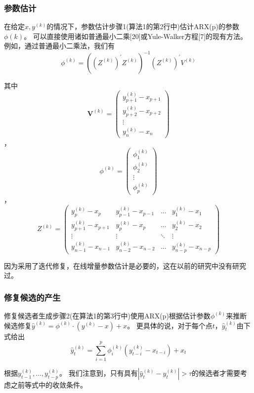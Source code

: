 \documentclass[12pt,a4paper]{article}
\begin{document}
\subsubsection{参数估计}
\par
在给定$x, y^{(k)}$的情况下，参数估计步骤1(算法1的第2行中)估计ARX(p)的参数$\phi(k)$。
可以直接使用诸如普通最小二乘[20]或Yule-Walker方程[7]的现有方法。例如，通过普通最小二乘法，我们有
\begin{equation}
\phi^{(k)}=\left(\left(Z^{(k)}\right)^{\prime} Z^{(k)}\right)^{-1}\left(Z^{(k)}\right)^{\prime} V^{(k)}
\end{equation}
\par
其中
\begin{equation}
\boldsymbol{V}^{(k)}=\left( \begin{array}{c}{y_{p+1}^{(k)}-x_{p+1}} \\ {y_{p+2}^{(k)}-x_{p+2}} \\ {\vdots} \\ {y_{n}^{(k)}-x_{n}}\end{array}\right)
\end{equation}
，
\begin{equation}
    \phi^{(k)}=\left( \begin{array}{c}{\phi_{1}^{(k)}} \\ {\phi_{2}^{(k)}} \\ {\vdots} \\ {\phi_{p}^{(k)}}\end{array}\right)
\end{equation}，
\begin{equation}
Z^{(k)}=\left( \begin{array}{cccc}{y_{p}^{(k)}-x_{p}} & {y_{p-1}^{(k)}-x_{p-1}} & {\dots} & {y_{1}^{(k)}-x_{1}} \\ {y_{p+1}^{(k)}-x_{p+1}} & {y_{p}^{(k)}-x_{p}} & {\dots} & {y_{2}^{(k)}-x_{2}} \\ {\vdots} & {\vdots} & {\ddots} & {\vdots} \\ {y_{n-1}^{(k)}-x_{n-1}} & {y_{n-2}^{(k)}-x_{n-2}} & {\dots} & {y_{n-p}^{(k)}-x_{n-p}}\end{array}\right)
\end{equation}
\par
因为采用了迭代修复，在线增量参数估计是必要的，这在以前的研究中没有研究过。
\subsubsection{修复候选的产生}
修复候选者生成步骤2(在算法1的第3行中)使用ARX(p)根据估计参数$\phi^{(k)}$来推断候选修复$\hat{y}^{(k)}=\phi^{(k)} \cdot\left(y^{(k)}-x\right)+x$。
更具体的说，对于每个点$t$，$\hat{y}_{t}^{(k)}$由下式给出
\begin{equation}
\hat{y}_{t}^{(k)}=\sum_{i=1}^{p} \phi_{i}^{(k)}\left(y_{t-i}^{(k)}-x_{t-i}\right)+x_{t}
\end{equation}
\par
根据$y_{t-1}^{(k)}, \ldots, y_{t-p}^{(k)}$。	
我们注意到，只有具有$\left|\hat{y}_{t}^{(k)}-y_{t}^{(k)}\right|>\tau$的候选者才需要考虑之前等式中的收敛条件。
\end{document}
